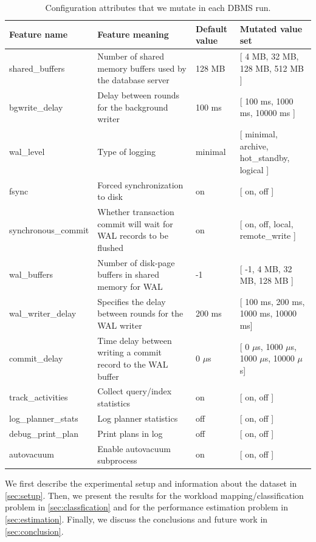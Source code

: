 \begin{table}
\centering
  \begin{adjustbox}{max width=\textwidth}
  \begin{tabular}{l|lll} 
	\toprule
   		Feature name &  Feature meaning & Default value & Mutated value set \\
    \midrule
    	shared\_buffers & Number of shared memory buffers used by the database
    	server & 128 MB &  [ 4 MB, 32 MB, 128 MB, 512 MB ] \\
    	bgwrite\_delay &  Delay between rounds for the
    	background writer & 100 ms &  [ 100 ms, 1000 ms, 10000 ms ] \\
    	wal\_level & Type of logging & minimal &  [ minimal, archive, hot\_standby,
    	logical ] \\
    	fsync & Forced synchronization to disk & on &  [ on, off ] \\
    	synchronous\_commit & Whether transaction commit will wait for WAL records to be flushed & on &  [ on, off, local,
    	remote\_write ] \\
    	wal\_buffers & Number of disk-page buffers in shared memory for WAL & 
    	-1 &  [ -1, 4 MB, 32 MB, 128 MB ] \\
    	wal\_writer\_delay & Specifies the delay between rounds for the
    	WAL writer & 200 ms &  [ 100 ms, 200 ms, 1000 ms, 10000 ms] \\
    	commit\_delay & Time delay between writing a commit record to the WAL
    	buffer & 0 $\mu$s &  [ 0 $\mu$s, 1000 $\mu$s, 1000 $\mu$s, 10000 $\mu$s] \\
    	track\_activities & Collect query/index statistics  & on &  [ on, off ]	\\
    	log\_planner\_stats & Log planner statistics  & off &  [ on, off ] \\
    	debug\_print\_plan & Print plans in log  & off &  [ on, off ] \\
    	autovacuum & Enable autovacuum subprocess  & on &  [ on, off ] \\    	    	
   \bottomrule
   \end{tabular}
   \end{adjustbox}   
\caption{Configuration attributes that we mutate in each DBMS run.}
\label{tab:mutate}
\end{table}

We first describe the experimental setup and information about the dataset
in \cref{sec:setup}. Then, we present the results for the
workload mapping/classification problem in \cref{sec:classfication} and for the
performance estimation problem in \cref{sec:estimation}. Finally, we discuss
the conclusions and future work in \cref{sec:conclusion}.


